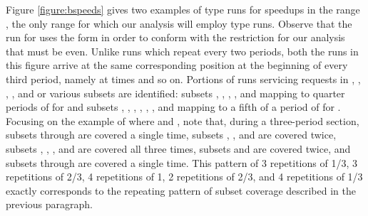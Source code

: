 \documentclass[11pt]{article}
\begin{document}
Figure \ref{figure:bspeeds} gives two examples of type  runs for speedups in the range , the only range for which our analysis will employ type  runs.  Observe that the run for  uses the form  in order to conform with the restriction for our analysis that  must be even.  Unlike  runs which repeat every two periods, both the runs in this figure arrive at the same corresponding position at the beginning of every third period, namely at times  and so on.  Portions of runs servicing requests in , , , , and  or various subsets are identified: subsets , , , , and   mapping to quarter periods of  for  and subsets , , , , , , and  mapping to a fifth of a period of  for .  Focusing on the example of  where  and , note that, during a three-period section, subsets  through  are covered a single time, subsets , , and  are covered twice, subsets , , , and  are covered all three times, subsets  and  are covered twice, and subsets  through  are covered a single time.  This pattern of 3 repetitions of 1/3, 3 repetitions of 2/3, 4 repetitions of 1, 2 repetitions of 2/3, and 4 repetitions of 1/3 exactly corresponds to the repeating pattern of subset coverage described in the previous paragraph.
\end{document}
